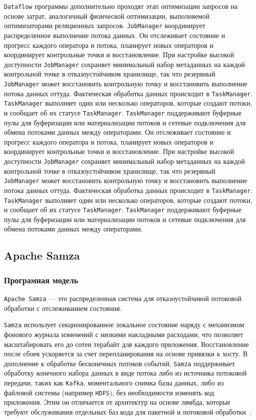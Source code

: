 \texttt{Dataflow} программы дополнительно проходят этап оптимизации запросов на основе затрат, аналогичный физической оптимизации, выполняемой оптимизаторами реляционных запросов.
\texttt{JobManager} координирует распределенное выполнение потока данных. 
Он отслеживает состояние и прогресс каждого оператора и потока, планирует новых операторов и координирует контрольные точки и восстановление.
При настройке высокой доступности \texttt{JobManager} сохраняет минимальный набор метаданных на каждой контрольной точке в отказоустойчивом хранилище, так что резервный \texttt{JobManager} может восстановить контрольную точку и восстановить выполнение потока данных оттуда. 
Фактическая обработка данных происходит в \texttt{TaskManager}.
\texttt{TaskManager} выполняет один или несколько операторов, которые создают потоки, и сообщает об их статусе \texttt{TaskManager}. 
\texttt{TaskManager} поддерживают буферные пулы для буферизации или материализации потоков и сетевые подключения для обмена потоками данных между операторами.
Он отслеживает состояние и прогресс каждого оператора и потока, планирует новых операторов и координирует контрольные точки и восстановление.
При настройке высокой доступности \texttt{JobManager} сохраняет минимальный набор метаданных на каждой контрольной точке в отказоустойчивом хранилище, так что резервный \texttt{JobManager} может восстановить контрольную точку и восстановить выполнение потока данных оттуда. 
Фактическая обработка данных происходит в \texttt{TaskManager}.
\texttt{TaskManager} выполняет один или несколько операторов, которые создают потоки, и сообщает об их статусе \texttt{TaskManager}. 
\texttt{TaskManager} поддерживают буферные пулы для буферизации или материализации потоков и сетевые подключения для обмена потоками данных между операторами.

\subsection{Apache Samza}

\subsubsection{Програмная модель}

\texttt{Apache Samza} --- это распределенная система для отказоустойчивой потоковой обработки с отслеживанием состояния. 

\texttt{Samza} использует секционированное локальное состояние наряду с механизмом фонового журнала изменений с низкими накладными расходами, что позволяет масштабировать его до сотен терабайт для каждого приложения. 
Восстановление после сбоев ускоряется за счет перепланирования на основе привязки к хосту. 
В дополнение к обработке бесконечных потоков событий, \texttt{Samza} поддерживает обработку конечного набора данных в виде потока либо из источника потоковой передачи, таких как \texttt{Kafka}, моментального снимка базы данных, либо из файловой системы (например \texttt{HDFS}), без необходимости изменять код приложения. 
Этим он отличается от архитектур на основе лямбда, которые требуют обслуживания отдельных баз кода для пакетной и потоковой обработки~\cite{10.14778/3137765.3137770}.

